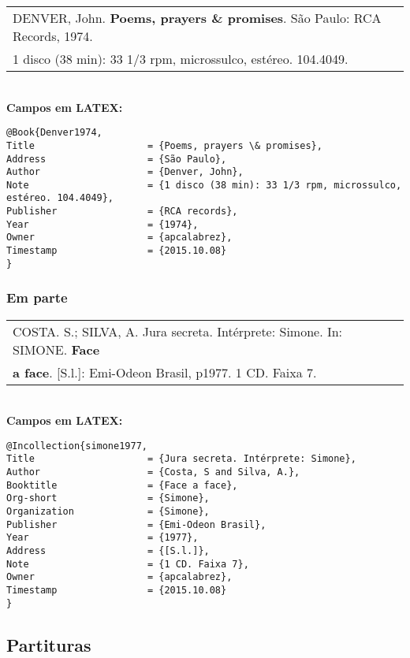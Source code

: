 \begin{tabular}{|l|c|} \hline
DENVER, John. \textbf{Poems, prayers \& promises}. São Paulo: RCA Records, 1974.\\
1 disco (38 min): 33 1/3 rpm, microssulco, estéreo. 104.4049.   
	\\\hline
\end{tabular} \\

\textbf{Campos em LATEX:} 

\begin{verbatim}
@Book{Denver1974,
Title                    = {Poems, prayers \& promises},
Address                  = {São Paulo},
Author                   = {Denver, John},
Note                     = {1 disco (38 min): 33 1/3 rpm, microssulco, 
estéreo. 104.4049},
Publisher                = {RCA records},
Year                     = {1974},
Owner                    = {apcalabrez},
Timestamp                = {2015.10.08}
}
\end{verbatim}
\subsubsection{Em parte}

\begin{tabular}{|l|c|} \hline
COSTA. S.; SILVA, A. Jura secreta. Intérprete: Simone. In: SIMONE. \textbf{Face}\\ \textbf{a face}. [S.l.]: Emi-Odeon Brasil, p1977. 1 CD. Faixa 7. 
	\\\hline
\end{tabular} \\

\textbf{Campos em LATEX:} 

\begin{verbatim}
@Incollection{simone1977,
Title                    = {Jura secreta. Intérprete: Simone},
Author                   = {Costa, S and Silva, A.},
Booktitle                = {Face a face},
Org-short                = {Simone},
Organization             = {Simone},
Publisher                = {Emi-Odeon Brasil},
Year                     = {1977},
Address                  = {[S.l.]},
Note                     = {1 CD. Faixa 7},
Owner                    = {apcalabrez},
Timestamp                = {2015.10.08}
}
\end{verbatim}

\subsection{Partituras}


